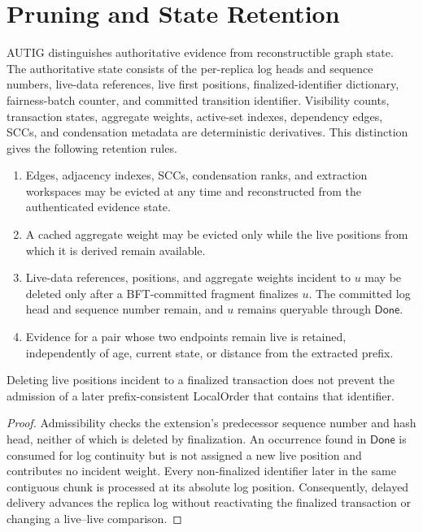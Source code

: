 \section{Pruning and State Retention}
\label{app:pruning-retention}

AUTIG distinguishes authoritative evidence from reconstructible graph state.
The authoritative state consists of the per-replica log heads and sequence
numbers, live-data references, live first positions, finalized-identifier
dictionary, fairness-batch counter, and committed transition identifier.
Visibility counts, transaction
states, aggregate weights, active-set indexes, dependency edges, SCCs, and
condensation metadata are deterministic derivatives.  This distinction gives
the following retention rules.

\begin{enumerate}
  \item Edges, adjacency indexes, SCCs, condensation ranks, and extraction
        workspaces may be evicted at any time and reconstructed from the
        authenticated evidence state.
  \item A cached aggregate weight may be evicted only while the live positions
        from which it is derived remain available.
  \item Live-data references, positions, and aggregate weights incident to $u$
        may be deleted only
        after a BFT-committed fragment finalizes $u$.  The committed log head
        and sequence number remain, and $u$ remains queryable through
        $\mathsf{Done}$.
  \item Evidence for a pair whose two endpoints remain live is retained,
        independently of age, current state, or distance from the extracted
        prefix.
\end{enumerate}

\begin{lemma}
\label{lem:delayed-extension-compatibility}
Deleting live positions incident to a finalized transaction does not prevent
the admission of a later prefix-consistent LocalOrder that contains that
identifier.
\end{lemma}

\begin{proof}
Admissibility checks the extension's predecessor sequence number and hash head,
neither of which is deleted by finalization.  An occurrence found in
$\mathsf{Done}$ is consumed for log continuity but is not assigned a new live
position and contributes no incident weight.  Every non-finalized identifier
later in the same contiguous chunk is processed at its absolute log position.
Consequently, delayed delivery advances the replica log without reactivating
the finalized transaction or changing a live--live comparison.
\end{proof}

